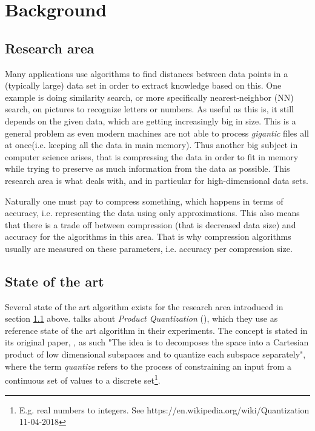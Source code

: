 \section{Background}
\label{background}

\subsection{Research area}
\label{research_area}
Many applications use algorithms to find distances between data points in a (typically large) data set in order to extract knowledge based on this. One example is doing similarity search, or more specifically nearest-neighbor (NN) search, on pictures to recognize letters or numbers. As useful as this is, it still depends on the given data, which are getting increasingly big in size. This is a general problem as even modern machines are not able to process \textit{gigantic} files all at once(i.e. keeping all the data in main memory). Thus another big subject in computer science arises, that is compressing the data in order to fit in memory while trying to preserve as much information from the data as possible. This research area is what \qs{} deals with, and in particular for high-dimensional data sets.

Naturally one must pay to compress something, which happens in terms of accuracy, i.e. representing the data using only approximations. This also means that there is a trade off between compression (that is decreased data size) and accuracy for the algorithms in this area. That is why compression algorithms usually are measured on these parameters, i.e. accuracy per compression size.

\subsection{State of the art}
\label{state_of_the_art}
Several state of the art algorithm exists for the research area introduced in section \ref{research_area} above. \cite{wagner17} talks about \textit{Product Quantization} (\pq{}), which they use as reference state of the art algorithm in their experiments. The \pq{} concept is stated in its original paper, \cite{schmid9}, as such "The idea is to decomposes the space into a Cartesian product of low dimensional subspaces and to quantize each subspace separately", where the term \textit{quantize} refers to the process of constraining an input from a continuous set of values to a discrete set\footnote{E.g. real numbers to integers. See https://en.wikipedia.org/wiki/Quantization 11-04-2018}.

